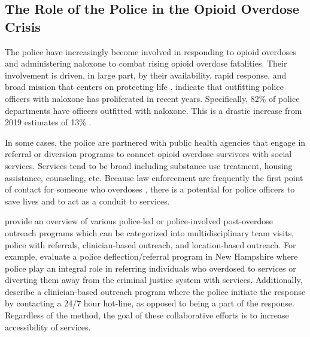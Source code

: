 \subsection{The Role of the Police in the Opioid Overdose Crisis}
The police have increasingly become involved in responding to opioid overdoses and administering naloxone to combat rising opioid overdose fatalities. Their involvement is driven, in large part, by their availability, rapid response, and broad mission that centers on protecting life \parencite{skolnick_above_1993}. \textcite{ray_national_2023} indicate that outfitting police officers with naloxone has proliferated in recent years. Specifically, 82\% of police departments have officers outfitted with naloxone. This is a drastic increase from 2019 estimates of 13\% \parencite{quinn_most_2019}.

In some cases, the police are partnered with public health agencies that engage in referral or diversion programs to connect opioid overdose survivors with social services. Services tend to be broad including substance use treatment, housing assistance, counseling, etc. Because law enforcement are frequently the first point of contact for someone who overdoses \parencite{beletsky_police_2011, silverman_harmonizing_2012}, there is a potential for police officers to save lives and to act as a conduit to services. 

\textcite{formica_characteristics_2021} provide an overview of various police-led or police-involved post-overdose outreach programs which can be categorized into multidisciplinary team visits, police with referrals, clinician-based outreach, and location-based outreach. For example, \textcite{donnelly_law_2022} evaluate a police deflection/referral program in New Hampshire where police play an integral role in referring individuals who overdosed to services or diverting them away from the criminal justice system with services. Additionally, \textcite{dahlem_recovery_2021} describe a clinician-based outreach program where the police initiate the response by contacting a 24/7 hour hot-line, as opposed to being a part of the response. Regardless of the method, the goal of these collaborative efforts is to increase accessibility of services.

